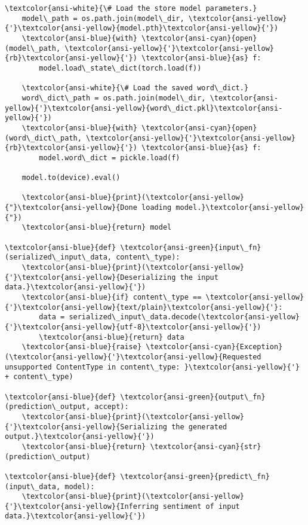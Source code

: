 \documentclass[11pt]{article}
\begin{document}
\begin{Verbatim}[commandchars=\\\{\}]
    \textcolor{ansi-white}{\# Load the store model parameters.}
    model\_path = os.path.join(model\_dir, \textcolor{ansi-yellow}{'}\textcolor{ansi-yellow}{model.pth}\textcolor{ansi-yellow}{'})
    \textcolor{ansi-blue}{with} \textcolor{ansi-cyan}{open}(model\_path, \textcolor{ansi-yellow}{'}\textcolor{ansi-yellow}{rb}\textcolor{ansi-yellow}{'}) \textcolor{ansi-blue}{as} f:
        model.load\_state\_dict(torch.load(f))

    \textcolor{ansi-white}{\# Load the saved word\_dict.}
    word\_dict\_path = os.path.join(model\_dir, \textcolor{ansi-yellow}{'}\textcolor{ansi-yellow}{word\_dict.pkl}\textcolor{ansi-yellow}{'})
    \textcolor{ansi-blue}{with} \textcolor{ansi-cyan}{open}(word\_dict\_path, \textcolor{ansi-yellow}{'}\textcolor{ansi-yellow}{rb}\textcolor{ansi-yellow}{'}) \textcolor{ansi-blue}{as} f:
        model.word\_dict = pickle.load(f)

    model.to(device).eval()

    \textcolor{ansi-blue}{print}(\textcolor{ansi-yellow}{"}\textcolor{ansi-yellow}{Done loading model.}\textcolor{ansi-yellow}{"})
    \textcolor{ansi-blue}{return} model

\textcolor{ansi-blue}{def} \textcolor{ansi-green}{input\_fn}(serialized\_input\_data, content\_type):
    \textcolor{ansi-blue}{print}(\textcolor{ansi-yellow}{'}\textcolor{ansi-yellow}{Deserializing the input data.}\textcolor{ansi-yellow}{'})
    \textcolor{ansi-blue}{if} content\_type == \textcolor{ansi-yellow}{'}\textcolor{ansi-yellow}{text/plain}\textcolor{ansi-yellow}{'}:
        data = serialized\_input\_data.decode(\textcolor{ansi-yellow}{'}\textcolor{ansi-yellow}{utf-8}\textcolor{ansi-yellow}{'})
        \textcolor{ansi-blue}{return} data
    \textcolor{ansi-blue}{raise} \textcolor{ansi-cyan}{Exception}(\textcolor{ansi-yellow}{'}\textcolor{ansi-yellow}{Requested unsupported ContentType in content\_type: }\textcolor{ansi-yellow}{'} + content\_type)

\textcolor{ansi-blue}{def} \textcolor{ansi-green}{output\_fn}(prediction\_output, accept):
    \textcolor{ansi-blue}{print}(\textcolor{ansi-yellow}{'}\textcolor{ansi-yellow}{Serializing the generated output.}\textcolor{ansi-yellow}{'})
    \textcolor{ansi-blue}{return} \textcolor{ansi-cyan}{str}(prediction\_output)

\textcolor{ansi-blue}{def} \textcolor{ansi-green}{predict\_fn}(input\_data, model):
    \textcolor{ansi-blue}{print}(\textcolor{ansi-yellow}{'}\textcolor{ansi-yellow}{Inferring sentiment of input data.}\textcolor{ansi-yellow}{'})


\end{Verbatim}
\end{document}
